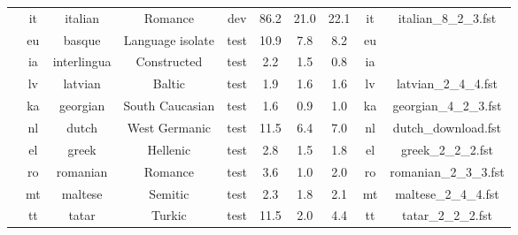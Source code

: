 \begin{table}[h!]
\begin{center}
\begin{tabular}{@{}cccccccccc@{}}
                                  & it                             & italian                        & Romance         &dev                 & 86.2       & 21.0       & 22.1     & it        & italian\_8\_2\_3.fst        \\
                                  & eu                             & basque                         & Language isolate     &test            & 10.9       & 7.8        & 8.2      & eu        &                             \\
                                  & ia                             & interlingua                    & Constructed       &test               & 2.2        & 1.5        & 0.8      & ia        &                             \\
                                  & lv                             & latvian                        & Baltic           &test                & 1.9        & 1.6        & 1.6      & lv        & latvian\_2\_4\_4.fst        \\
                                  & ka                             & georgian                       & South Caucasian   &test               & 1.6        & 0.9        & 1.0      & ka        & georgian\_4\_2\_3.fst       \\
                                  & nl                             & dutch                          & West Germanic    &test                & 11.5       & 6.4        & 7.0      & nl        & dutch\_download.fst         \\
                                  & el                             & greek                          & Hellenic      &test                   & 2.8        & 1.5        & 1.8      & el        & greek\_2\_2\_2.fst          \\
                                  & ro                             & romanian                       & Romance     &test                     & 3.6        & 1.0        & 2.0      & ro        & romanian\_2\_3\_3.fst       \\
                                  & mt                             & maltese                        & Semitic     &test                     & 2.3        & 1.8        & 2.1      & mt        & maltese\_2\_4\_4.fst        \\
                                  & tt                             & tatar                          & Turkic      &test                     & 11.5       & 2.0        & 4.4      & tt        & tatar\_2\_2\_2.fst          \\

\end{tabular}
\end{center}
\end{table}
